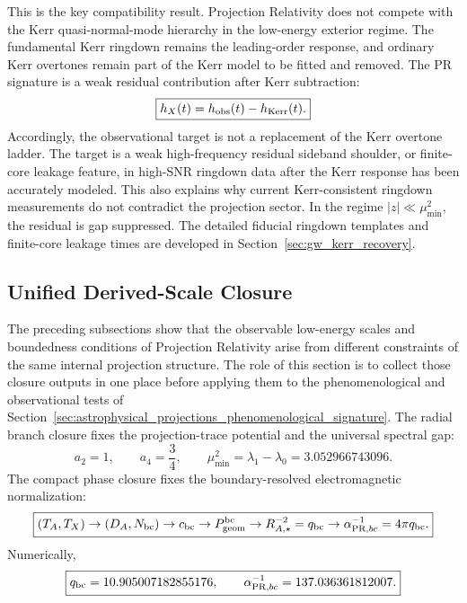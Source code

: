 \documentclass[11pt]{article}
\begin{document}
This is the key compatibility result. Projection Relativity does not compete
with the Kerr quasi-normal-mode hierarchy in the low-energy exterior regime.
The fundamental Kerr ringdown remains the leading-order response, and ordinary
Kerr overtones remain part of the Kerr model to be fitted and removed. The PR
signature is a weak residual contribution after Kerr subtraction:
\begin{equation}
\boxed{
h_X(t)
=
h_{\rm obs}(t)-h_{\rm Kerr}(t).
}
\end{equation}
Accordingly, the observational target is not a replacement of the Kerr overtone
ladder. The target is a weak high-frequency residual sideband shoulder, or
finite-core leakage feature, in high-SNR ringdown data after the Kerr response
has been accurately modeled. This also explains why current Kerr-consistent ringdown measurements do not
contradict the projection sector. In the regime \( |z|\ll\mu_{\min}^2 \), the
residual is gap suppressed. The detailed fiducial ringdown templates and
finite-core leakage times are developed in Section~\ref{sec:gw_kerr_recovery}.

\subsection{Unified Derived-Scale Closure}
\label{sec:unified_derived_scale_closure}

The preceding subsections show that the observable low-energy scales and
boundedness conditions of Projection Relativity arise from different constraints
of the same internal projection structure. The role of this section is to collect
those closure outputs in one place before applying them to the phenomenological
and observational tests of Section~\ref{sec:astrophysical_projections_phenomenological_signature}. The radial branch closure fixes the projection-trace potential and the universal
spectral gap:
\begin{equation}
\boxed{
a_2=1,
\qquad
a_4=\frac34,
\qquad
\mu_{\min}^2=\lambda_1-\lambda_0
=
3.052966743096.
}
\end{equation}
The compact phase closure fixes the boundary-resolved electromagnetic
normalization:
\begin{equation}
\boxed{
(T_A,T_X)
\rightarrow
(D_A,N_{\rm bc})
\rightarrow
c_{\rm bc}
\rightarrow
P_{\rm geom}^{\rm bc}
\rightarrow
R_{A,\star}^{-2}
=
q_{\rm bc}
\rightarrow
\alpha_{{\rm PR},bc}^{-1}
=
4\pi q_{\rm bc}.
}
\end{equation}
Numerically,
\begin{equation}
\boxed{
q_{\rm bc}
=
10.905007182855176,
\qquad
\alpha_{{\rm PR},bc}^{-1}
=
137.036361812007.
}
\end{equation}
\end{document}
